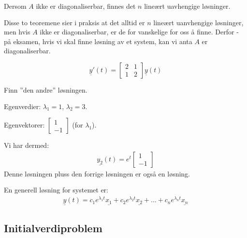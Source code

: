 \documentclass[11pt, a4paper, norsk]{article}
\begin{document}
            \begin{Theorem}{}{}
                Dersom $A$ ikke er diagonaliserbar, finnes det $n$ lineært uavhengige løsninger. 
            \end{Theorem}

            Disse to teoremene sier i praksis at det alltid er $n$ lineært uanvhengige løsninger, men hvis $A$ ikke er diagonaliserbar, er de for vanskelige for oss å finne. Derfor - på eksamen, hvis vi skal finne løsning av et system, kan vi anta $A$ er diagonaliserbar. 

            \begin{Example}{}{}
                $$\underline{y}'(t) = \begin{bmatrix}
                    2 & 1 \\
                    1 & 2
                \end{bmatrix} \underline{y}(t)$$ 

                Finn ''den andre'' løsningen.

                Egenverdier: $\lambda_1 = 1$, $\lambda_2 = 3$. 

                Egenvektorer: $\begin{bmatrix}
                    1 \\
                    -1
                \end{bmatrix}$ (for $\lambda_{1}$).

                Vi har dermed:
                \begin{align*}
                    \underline{y_2}(t) = e^{t}\begin{bmatrix}
                        1 \\
                        -1
                    \end{bmatrix}
                \end{align*}
                Denne løsningen pluss den forrige løsningen er også en løsning.

                En generell løsning for systemet er:
                \begin{align*}
                    \underline{y}(t) = c_1e^{\lambda_1 t}\underline{x_1} + c_2e^{\lambda_2 t}\underline{x_2} + \dots + c_{n}e^{\lambda_{n} t}\underline{x_{n}}
                \end{align*}
            \end{Example}

            \subsection{Initialverdiproblem}%
            \label{sub:initialverdiproblem}
            
\end{document}

